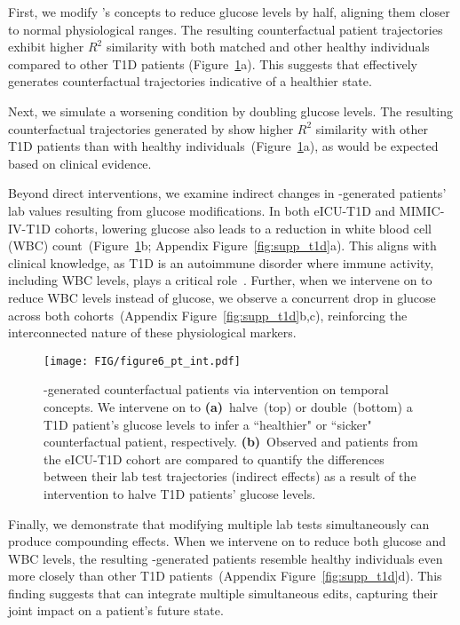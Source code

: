 %
First, we modify \name's concepts to reduce glucose levels by half, aligning them closer to normal physiological ranges. The resulting counterfactual patient trajectories exhibit higher \(R^2\) similarity with both matched and other healthy individuals compared to other T1D patients (Figure~\ref{fig:t1d}a). This suggests that \name effectively generates counterfactual trajectories indicative of a healthier state.  

Next, we simulate a worsening condition by doubling glucose levels. The resulting counterfactual trajectories generated by \name show higher \(R^2\) similarity with other T1D patients than with healthy individuals~(Figure~\ref{fig:t1d}a), as would be expected based on clinical evidence.  

Beyond direct interventions, we examine indirect changes in \name-generated patients' lab values resulting from glucose modifications. In both eICU-T1D and MIMIC-IV-T1D cohorts, lowering glucose also leads to a reduction in white blood cell (WBC) count~(Figure~\ref{fig:t1d}b; Appendix Figure~\ref{fig:supp_t1d}a). This aligns with clinical knowledge, as T1D is an autoimmune disorder where immune activity, including WBC levels, plays a critical role~\cite{quattrin2023type}. Further, when we intervene on \name to reduce WBC levels instead of glucose, we observe a concurrent drop in glucose across both cohorts~(Appendix Figure~\ref{fig:supp_t1d}b,c), reinforcing the interconnected nature of these physiological markers.  




\begin{figure}[ht]
\begin{center}
\centerline{\texttt{[image: FIG/figure6\_pt\_int.pdf]}}
\caption{\name-generated counterfactual patients via intervention on temporal concepts. We intervene on \name to \textbf{(a)}~halve~(top) or double~(bottom) a T1D patient's glucose levels to infer a ``healthier" or ``sicker" counterfactual patient, respectively. \textbf{(b)}~Observed and \name patients from the eICU-T1D cohort are compared to quantify the differences between their lab test trajectories (indirect effects) as a result of the intervention to halve T1D patients' glucose levels.}
\label{fig:t1d}
\end{center}
\vskip -0.35in
\end{figure}

Finally, we demonstrate that modifying multiple lab tests simultaneously can produce compounding effects. When we intervene on \name to reduce both glucose and WBC levels, the resulting \name-generated patients resemble healthy individuals even more closely than other T1D patients~(Appendix Figure~\ref{fig:supp_t1d}d). This finding suggests that \name can integrate multiple simultaneous edits, capturing their joint impact on a patient's future state.


